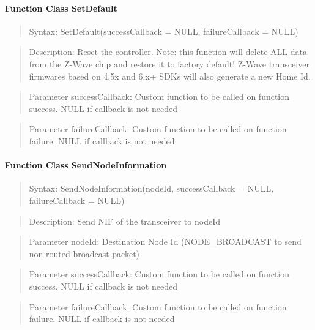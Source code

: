 \paragraph {Function Class SetDefault}
\begin{quote} Syntax: SetDefault(successCallback = NULL, failureCallback = NULL)\end{quote}
\begin{quote} Description: Reset the controller. Note: this function will delete ALL data 
from the Z-Wave chip and restore it to factory default! Z-Wave transceiver firmwares based 
on 4.5x and 6.x+ SDKs will also generate a new Home Id.\end{quote}
\begin{quote} Parameter successCallback: Custom function to be called on function success. NULL if callback is not needed\end{quote} 
\begin{quote} Parameter failureCallback: Custom function to be called on function failure. NULL if callback is not needed\end{quote} 

\paragraph {Function Class SendNodeInformation}
\begin{quote} Syntax: SendNodeInformation(nodeId, successCallback = NULL, failureCallback = NULL)\end{quote}
\begin{quote} Description: Send NIF of the transceiver to nodeId\end{quote}
\begin{quote} Parameter nodeId: Destination Node Id (NODE\_BROADCAST to send non-routed broadcast packet)\end{quote}
\begin{quote} Parameter successCallback: Custom function to be called on function success. NULL if callback is not needed\end{quote} 
\begin{quote} Parameter failureCallback: Custom function to be called on function failure. NULL if callback is not needed\end{quote} 

